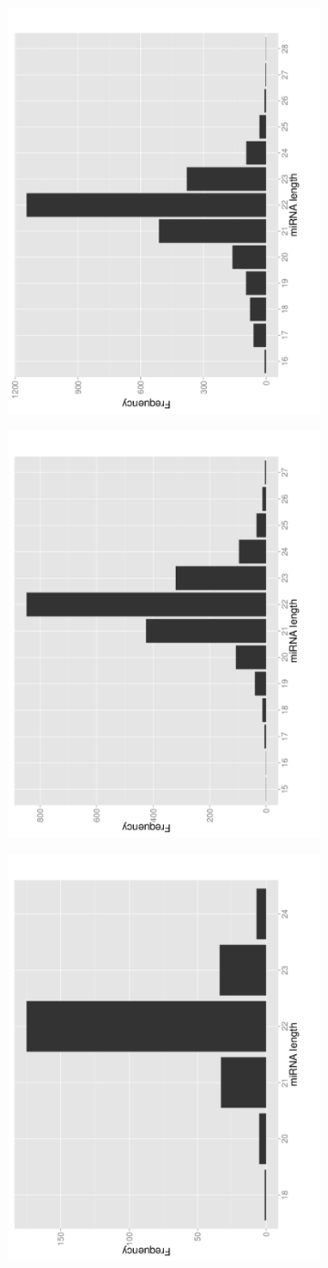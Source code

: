 \documentclass{article}
\begin{document}
\begin{figure}
   \centering
   \begin{subfigure}{.5\textwidth}
      \centering
      \includegraphics[width=.5\textwidth,natwidth=100,natheight=100,angle=270]{human_mirbase_length.pdf}
      \caption{}
      \label{fig:human_mirna_length}
   \end{subfigure}%
   \begin{subfigure}{.5\textwidth}
      \centering
      \includegraphics[width=.5\textwidth,natwidth=100,natheight=100,angle=270]{mouse_mirbase_length.pdf}
      \caption{}
      \label{fig:mouse_mirna_length}
   \end{subfigure}
   \begin{subfigure}{.5\columnwidth}
      \centering
      \includegraphics[width=.5\textwidth,natwidth=100,natheight=100,angle=270]{zebrafish_mirbase_length.pdf}

\end{subfigure}
\end{figure}
\end{document}
